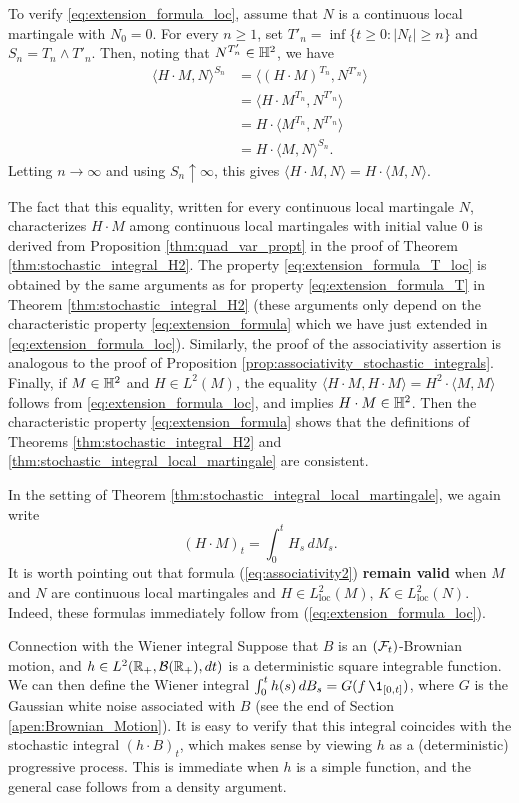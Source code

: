 \documentclass[../Main.tex]{subfiles}
\begin{document}
{To verify \eqref{eq:extension_formula_loc}, assume that \(N\) is a
continuous local martingale with \(N_0=0\). For every \(n\ge1\), set
\(T'_n = \inf\{t\ge0:|N_t|\ge n\}\) and \(S_n = T_n\wedge T'_n\). Then,
noting that \(N^{T'_n}\in\mathbb{H}^2\), we have
\begin{align*}
\langle H\cdot M, N\rangle^{S_n}
&= \langle (H\cdot M)^{T_n}, N^{T'_n}\rangle\\
&= \langle H\cdot M^{T_n}, N^{T'_n}\rangle\\
&= H\cdot \langle M^{T_n}, N^{T'_n}\rangle\\
&= H\cdot \langle M,N\rangle^{S_n}.
\end{align*}
Letting \(n\to\infty\) and using \(S_n\uparrow\infty\), this gives
\(\langle H\cdot M, N\rangle = H\cdot \langle M,N\rangle\).

The fact that this equality, written for every continuous local martingale
\(N\), characterizes \(H\cdot M\) among continuous local martingales with
initial value \(0\) is derived from Proposition \ref{thm:quad_var_propt}
in the proof of Theorem \ref{thm:stochastic_integral_H2}. The property
\eqref{eq:extension_formula_T_loc} is obtained by the same arguments as
for property \eqref{eq:extension_formula_T} in Theorem
\ref{thm:stochastic_integral_H2} (these arguments only depend on the
characteristic property \eqref{eq:extension_formula} which we have just
extended in \eqref{eq:extension_formula_loc}). Similarly, the proof of the
associativity assertion is analogous to the proof of Proposition \ref{prop:associativity_stochastic_integrals}.
Finally, if \(M\in\mathbb{H}^2\) and \(H\in L^2(M)\), the equality
\(\langle H\cdot M, H\cdot M\rangle = H^2\cdot \langle M,M\rangle\) follows
from \eqref{eq:extension_formula_loc}, and implies \(H\cdot M\in\mathbb{H}^2\).
Then the characteristic property \eqref{eq:extension_formula} shows that
the definitions of Theorems \ref{thm:stochastic_integral_H2} and
\ref{thm:stochastic_integral_local_martingale} are consistent.
}

In the setting of Theorem \ref{thm:stochastic_integral_local_martingale}, we again write
\[
(H\cdot M)_t=\int_0^t H_s\,dM_s.
\]
It is worth pointing out that formula (\ref{eq:associativity2}) \textbf{remain valid} when $M$ and $N$ are continuous local martingales and $H \in L_{\mathrm{loc}}^2(M)$, $K \in L_{\mathrm{loc}}^2(N)$. Indeed, these formulas immediately follow from (\ref{eq:extension_formula_loc}).


Connection with the Wiener integral Suppose that $B$ is an $(\mathcal{F}_t)$-Brownian motion, and $h \in L^2(\mathbb{R}_+, \mathcal{B}(\mathbb{R}_+), dt)$ is a deterministic square integrable function. We can then define the Wiener integral $\int_0^t h(s) \, dB_s = G(f \, \1_{[0, t]})$, where $G$ is the Gaussian white noise associated with $B$ (see the end of Section \ref{apen:Brownian_Motion}). It is easy to verify that this integral coincides with the stochastic integral $(h \cdot B)_t$, which makes sense by viewing $h$ as a (deterministic) progressive process. This is immediate when $h$ is a simple function, and the general case follows from a density argument.
\end{document}
